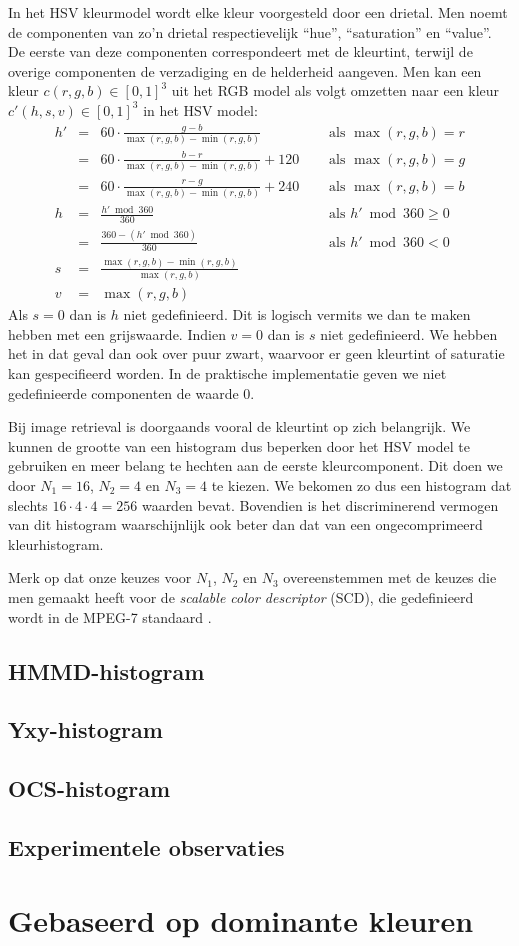 In het HSV kleurmodel wordt elke kleur voorgesteld door een drietal. Men noemt de componenten van 
zo'n drietal respectievelijk ``hue'', ``saturation'' en ``value''. De eerste van deze componenten
correspondeert met de kleurtint, terwijl de overige componenten de verzadiging en de helderheid
aangeven. Men kan een kleur $c(r,g,b) \in [0,1]^3$ uit het RGB model als volgt omzetten naar een 
kleur $c'(h,s,v) \in [0,1]^3$ in het HSV model:
$$
\begin{array}{rcll}
h' & = & 60 \cdot \frac{g - b}{\max (r,g,b) - \min (r,g,b)}\quad & \textrm{ als } \max (r,g,b) = r \\
  & = & 60 \cdot \frac{b - r}{\max (r,g,b) - \min (r,g,b)} + 120\quad & \textrm{ als } \max (r,g,b) = g \\
  & = & 60 \cdot \frac{r - g}{\max (r,g,b) - \min (r,g,b)} + 240\quad & \textrm{ als } \max (r,g,b) = b \\[5pt]
h & = & \frac{h' \bmod 360}{360} & \textrm{ als } h' \bmod 360 \geq 0 \\
  & = & \frac{360 - (h' \bmod 360)}{360} & \textrm{ als } h' \bmod 360 < 0 \\[5pt]
s & = & \frac{\max (r,g,b) - \min (r,g,b)}{\max (r,g,b)} & \\[5pt]
v & = & \max (r,g,b)
\end{array}
$$
Als $s=0$ dan is $h$ niet gedefinieerd. Dit is logisch vermits we dan te maken hebben met een 
grijswaarde. Indien $v=0$ dan is $s$ niet gedefinieerd. We hebben het in dat geval dan ook over 
puur zwart, waarvoor er geen kleurtint of saturatie kan gespecifieerd worden. In de praktische
implementatie geven we niet gedefinieerde componenten de waarde 0.

Bij image retrieval is doorgaands vooral de kleurtint op zich belangrijk. We kunnen de grootte van
een histogram dus beperken door het HSV model te gebruiken en meer belang te hechten aan de
eerste kleurcomponent. Dit doen we door $N_1=16$, $N_2=4$ en $N_3=4$ te kiezen. We bekomen zo dus
een histogram dat slechts $16 \cdot 4 \cdot 4 = 256$ waarden bevat. Bovendien is het discriminerend
vermogen van dit histogram waarschijnlijk ook beter dan dat van een ongecomprimeerd kleurhistogram.

Merk op dat onze keuzes voor $N_1$, $N_2$ en $N_3$ overeenstemmen met de keuzes die men gemaakt
heeft voor de \emph{scalable color descriptor} (SCD), die gedefinieerd wordt in de MPEG-7
standaard \cite{manjunath:color_and_texture_descriptors}.

\subsection{HMMD-histogram}

\subsection{Yxy-histogram}

\subsection{OCS-histogram}

\subsection{Experimentele observaties}


\section{Gebaseerd op dominante kleuren}
